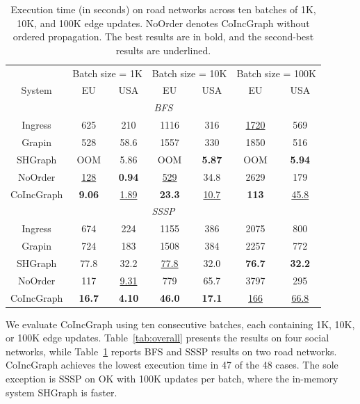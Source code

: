\begin{table}[t]
\centering
\footnotesize
\setlength{\tabcolsep}{4pt}
\caption{Execution time (in seconds) on road networks across ten batches of 1K, 10K, and 100K edge updates. NoOrder denotes CoIncGraph without ordered propagation. The best results are in bold, and the second-best results are underlined.}
\label{tab:road}
\begin{tabular*}{0.97\columnwidth}{c|cc|cc|cc}
\hline
 & \multicolumn{2}{c|}{Batch size = 1K}
 & \multicolumn{2}{c|}{Batch size = 10K}
 & \multicolumn{2}{c}{Batch size = 100K} \\
System & EU & USA & EU & USA & EU & USA \\
\hline
\multicolumn{7}{c}{\textit{BFS}} \\
\hline
Ingress    & 625 & 210 & 1116 & 316 & \underline{1720} & 569 \\
Grapin     & 528 & 58.6 & 1557 & 330 & 1850 & 516 \\
SHGraph    & OOM & 5.86 & OOM & \textbf{5.87} & OOM & \textbf{5.94} \\
NoOrder    & \underline{128} & \textbf{0.94} & \underline{529} & 34.8 & 2629 & 179 \\
CoIncGraph & \textbf{9.06} & \underline{1.89} & \textbf{23.3} & \underline{10.7} & \textbf{113} & \underline{45.8} \\
\hline
\multicolumn{7}{c}{\textit{SSSP}} \\
\hline
Ingress    & 674 & 224 & 1155 & 386 & 2075 & 800 \\
Grapin     & 724 & 183 & 1508 & 384 & 2257 & 772 \\
SHGraph    & 77.8 & 32.2 & \underline{77.8} & 32.0 & \textbf{76.7} & \textbf{32.2} \\
NoOrder    & 117 & \underline{9.31} & 779 & 65.7 & 3797 & 295 \\
CoIncGraph & \textbf{16.7} & \textbf{4.10} & \textbf{46.0} & \textbf{17.1} & \underline{166} & \underline{66.8} \\
\hline
\end{tabular*}
\end{table}

We evaluate CoIncGraph using ten consecutive batches, each containing 1K, 10K, or 100K edge updates. Table~\ref{tab:overall} presents the results on four social networks, while Table~\ref{tab:road} reports BFS and SSSP results on two road networks. CoIncGraph achieves the lowest execution time in 47 of the 48 cases. The sole exception is SSSP on OK with 100K updates per batch, where the in-memory system SHGraph is faster.

